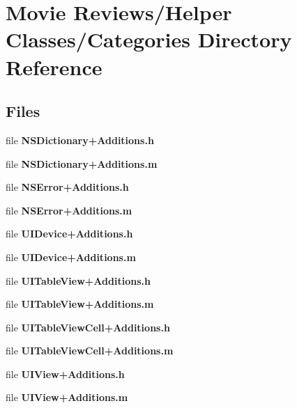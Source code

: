 \section{Movie Reviews/\+Helper Classes/\+Categories Directory Reference}
\label{dir_e052abff7c987cbec55372db54139aa9}
\subsection*{Files}
\begin{DoxyCompactItemize}
\item 
file {\bfseries N\+S\+Dictionary+\+Additions.\+h}
\item 
file {\bfseries N\+S\+Dictionary+\+Additions.\+m}
\item 
file {\bfseries N\+S\+Error+\+Additions.\+h}
\item 
file {\bfseries N\+S\+Error+\+Additions.\+m}
\item 
file {\bfseries U\+I\+Device+\+Additions.\+h}
\item 
file {\bfseries U\+I\+Device+\+Additions.\+m}
\item 
file {\bfseries U\+I\+Table\+View+\+Additions.\+h}
\item 
file {\bfseries U\+I\+Table\+View+\+Additions.\+m}
\item 
file {\bfseries U\+I\+Table\+View\+Cell+\+Additions.\+h}
\item 
file {\bfseries U\+I\+Table\+View\+Cell+\+Additions.\+m}
\item 
file {\bfseries U\+I\+View+\+Additions.\+h}
\item 
file {\bfseries U\+I\+View+\+Additions.\+m}
\end{DoxyCompactItemize}
